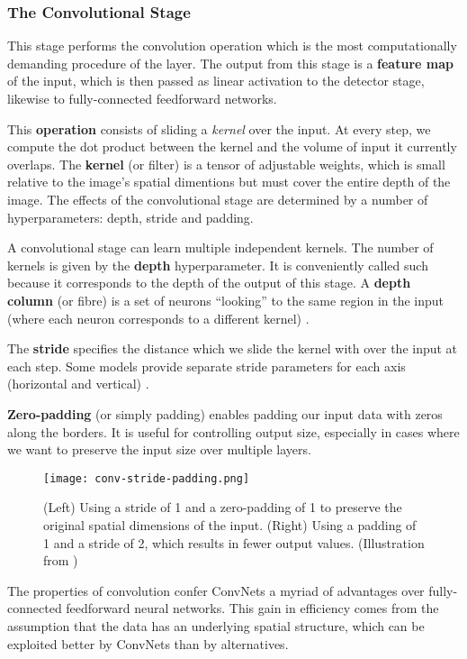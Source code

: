 \subsubsection{The Convolutional Stage}
This stage performs the convolution operation which is the most computationally demanding procedure of the layer.
The output from this stage is a \textbf{feature map} of the input, which is then passed as linear activation to the detector stage, likewise to fully-connected feedforward networks.

This \textbf{operation} consists of sliding a \emph{kernel} over the input.
At every step, we compute the dot product between the kernel and the volume of input it currently overlaps.
The \textbf{kernel} (or filter) is a tensor of adjustable weights, which is small relative to the image's spatial dimentions but must cover the entire depth of the image.
The effects of the convolutional stage are determined by a number of hyperparameters: depth, stride and padding.

A convolutional stage can learn multiple independent kernels.
The number of kernels is given by the \textbf{depth} hyperparameter.
It is conveniently called such because it corresponds to the depth of the output of this stage.
A \textbf{depth column} (or fibre) \cite{stanford-convnets} is a set of neurons ``looking'' to the same region in the input (where each neuron corresponds to a different kernel) .

The \textbf{stride} specifies the distance which we slide the kernel with over the input at each step.
Some models provide separate stride parameters for each axis (horizontal and vertical) \cite{Goodfellow-et-al-2016}.

\textbf{Zero-padding} (or simply padding) enables padding our input data with zeros along the borders. It is useful for controlling output size, especially in cases where we want to preserve the input size over multiple layers.

\begin{figure}[h]
    \centering
    \texttt{[image: conv-stride-padding.png]}
    \caption{(Left) Using a stride of 1 and a zero-padding of 1 to preserve the original spatial dimensions of the input. (Right) Using a padding of 1 and a stride of 2, which results in fewer output values. (Illustration from \cite{stanford-convnets})}
    \label{fig:conv-stride-padding}
\end{figure}
 
The properties of convolution confer ConvNets a myriad of advantages over fully-connected feedforward neural networks.
This gain in efficiency comes from the assumption that the data has an underlying spatial structure, which can be exploited better by ConvNets than by alternatives.

